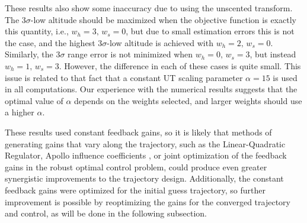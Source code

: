 \documentclass[journal ]{new-aiaa}
\begin{document}
These results also show some inaccuracy due to using the unscented transform. The 3$\sigma$-low altitude should be maximized when the objective function is exactly this quantity, i.e., $w_h=3,\,w_s=0$, but due to small estimation errors this is not the case, and the highest 3$\sigma$-low altitude is achieved with $w_h=2,\,w_s=0$. Similarly, the 3$\sigma$ range error is not minimized when $w_h=0,\,w_s=3$, but instead $w_h=1,\,w_s=3$. However, the difference in each of these cases is quite small. This issue is related to that fact that a constant UT scaling parameter $\alpha=15$ is used in all computations. Our experience with the numerical results suggests that the optimal value of $\alpha$ depends on the weights selected, and larger weights should use a higher $\alpha$. 

These results used constant feedback gains, so it is likely that methods of generating gains that vary along the trajectory, such as the Linear-Quadratic Regulator, Apollo influence coefficients \cite{Apollo}, or joint optimization of the feedback gains in the robust optimal control problem, could produce even greater synergistic improvements to the trajectory design. Additionally, the constant feedback gains were optimized for the initial guess trajectory, so further improvement is possible by reoptimizing the gains for the converged trajectory and control, as will be done in the following subsection.
\end{document}
